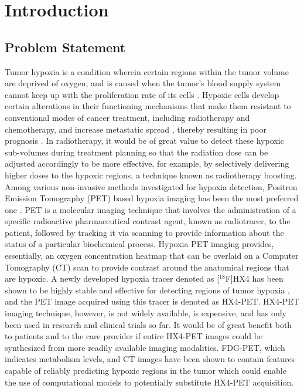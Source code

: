 \chapter{Introduction}
\label{Introduction}



\section{Problem Statement}
Tumor hypoxia is a condition wherein certain regions within the tumor volume are deprived of oxygen, and is caused when the tumor's blood supply system cannot keep up with the proliferation rate of its cells \cite{hockel2001tumor}. Hypoxic cells develop certain alterations in their functioning mechanisms that make them resistant to conventional modes of cancer treatment, including radiotherapy and chemotherapy, and increase metastatic spread \cite{muz2015role}, thereby resulting in poor prognosis \cite{vaupel2007hypoxia}. In radiotherapy, it would be of great value to detect these hypoxic sub-volumes during treatment planning so that the radiation dose can be adjusted accordingly to be more effective, for example, by selectively delivering higher doses to the hypoxic regions, a technique known as radiotherapy boosting. Among various non-invasive methods investigated for hypoxia detection, Positron Emission Tomography (PET) based hypoxia imaging has been the most preferred one \cite{fleming2015imaging}. PET is a molecular imaging technique that involves the administration of a specific radioactive pharmaceutical contrast agent, known as radiotracer, to the patient, followed by tracking it via scanning to provide information about the status of a particular biochemical process. Hypoxia PET imaging provides, essentially, an oxygen concentration heatmap that can be overlaid on a Computer Tomography (CT) scan to provide contrast around the anatomical regions that are hypoxic. A newly developed hypoxia tracer denoted as [$^{18}$F]HX4 has been shown to be highly stable and effective for detecting regions of tumor hypoxia \cite{sanduleanu2020hypoxia}, and the PET image acquired using this tracer is denoted as HX4-PET. HX4-PET imaging technique, however, is not widely available, is expensive, and has only been used in research and clinical trials so far. It would be of great benefit both to patients and to the care provider if entire HX4-PET images could be synthesized from more readily available imaging modalities. FDG-PET, which indicates metabolism levels, and CT images have been shown to contain features capable of reliably predicting hypoxic regions in the tumor \cite{even2017predicting, sanduleanu2020non} which could enable the use of computational models to potentially substitute HX4-PET acquisition.

